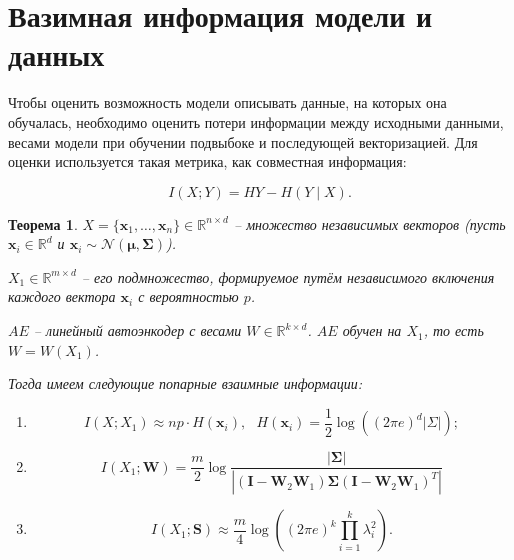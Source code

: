 \documentclass[a4paper, 14pt]{article}
\newtheorem{theorem}{Теорема}
\begin{document}
\section{Вазимная информация модели и данных}

Чтобы оценить возможность модели описывать данные, на которых она обучалась, необходимо оценить потери информации между исходными данными, весами модели при обучении подвыбоке и последующей векторизацией. Для оценки используется такая метрика, как совместная информация:

\[I(X; Y) = HY - H(Y \mid X).\]

\begin{theorem}
\label{thm:info}
$X = \{\mathbf{x}_1, \dots, \mathbf{x}_n\} \in \mathbb{R}^{n \times d}$ -- множество независимых векторов (пусть $\mathbf{x}_i \in \mathbb{R}^d$ и $\mathbf{x}_i \sim \mathcal{N}(\boldsymbol{\mu}, \boldsymbol{\Sigma})$).

$X_1 \in \mathbb{R}^{m \times d}$ -- его подмножество, формируемое путём независимого включения каждого вектора $\mathbf{x}_i$ с вероятностью $p$.

$AE$ -- линейный автоэнкодер с весами $W \in \mathbb{R}^{k\times d}$. $AE$ обучен на $X_1$, то есть $W = W(X_1)$.

Тогда имеем следующие попарные взаимные информации:

\begin{enumerate}
    \item \[I(X; X_1) \approx np \cdot H(\mathbf{x}_i), ~~~  H(\mathbf{x}_i) = \frac{1}{2} \log \left( (2 \pi e)^d |\Sigma| \right);\]

    \item \[I(X_1; \mathbf{W}) = \frac{m}{2} \log \frac{|\boldsymbol{\Sigma}|}{|(\mathbf{I} - \mathbf{W}_2 \mathbf{W}_1) \boldsymbol{\Sigma} (\mathbf{I} - \mathbf{W}_2 \mathbf{W}_1)^T|}\]

    \item \[I(X_1; \mathbf{S}) \approx \frac{m}{4} \log \left( (2\pi e)^k \prod_{i=1}^k \lambda_i^2 \right).\]
\end{enumerate}
\end{theorem}
\end{document}
